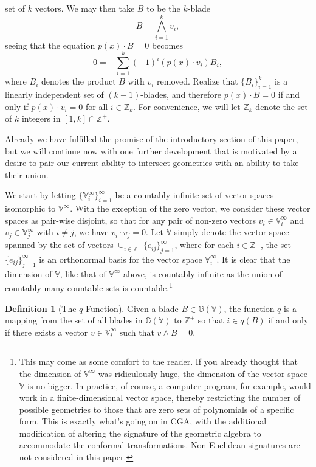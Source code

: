 \documentclass{birkjour}
\theoremstyle{definition}
\newtheorem{defn}[thm]{Definition}
\theoremstyle{remark}
\numberwithin{equation}{section}
\newcommand{\G}{\mathbb{G}}
\newcommand{\V}{\mathbb{V}}
\newcommand{\Z}{\mathbb{Z}}
\begin{document}
set of $k$ vectors.
We may then take $B$ to be the $k$-blade
\begin{equation}
B=\bigwedge_{i=1}^k v_i,
\end{equation}
seeing that the equation $p(x)\cdot B=0$ becomes
\begin{equation}\label{equ_intersection_of_geometries}
0 = -\sum_{i=1}^k (-1)^i(p(x)\cdot v_i)B_i,
\end{equation}
where $B_i$ denotes the product $B$ with $v_i$ removed.  Realize
that $\{B_i\}_{i=1}^k$ is a linearly independent set of $(k-1)$-blades,
and therefore $p(x)\cdot B=0$ if and only if $p(x)\cdot v_i=0$ for all $i\in\Z_k$.
For convenience, we will let $\Z_k$ denote the set of $k$ integers in $[1,k]\cap\Z^+$.

Already we have fulfilled the promise of the introductory section of this paper,
but we will continue now with one further development that is motivated by a desire
to pair our current ability to intersect geometries with an ability to take their union.

We start by letting $\{\V_i^\infty\}_{i=1}^\infty$ be a countably infinite set of
vector spaces isomorphic to $\V^\infty$.  With the exception of the zero vector,
we consider these vector spaces as pair-wise disjoint, so that for any pair of non-zero
vectors $v_i\in\V_i^\infty$ and $v_j\in\V_j^\infty$ with $i\neq j$, we have $v_i\cdot v_j=0$.
Let $\V$ simply denote the vector space spanned by the set of vectors $\cup_{i\in\Z^+}\{e_{ij}\}_{j=1}^\infty$,
where for each $i\in\Z^+$, the set $\{e_{ij}\}_{j=1}^\infty$ is an orthonormal basis for
the vector space $\V_i^\infty$.
It is clear that the dimension of $\V$,
like that of $\V^\infty$ above, is countably infinite as the union of countably many countable
sets is countable.\footnote{This may come as some comfort to the reader. If you already thought that
the dimension of $\V^\infty$ was ridiculously huge, the dimension of the vector space $\V$ is no bigger.
In practice, of course, a computer
program, for example, would work in a finite-dimensional vector space, thereby restricting
the number of possible geometries to those that are zero sets of polynomials of a specific form.
This is exactly what's going on in CGA, with the additional modification of altering the signature
of the geometric algebra to accommodate the conformal transformations.  Non-Euclidean signatures
are not considered in this paper.}

\begin{defn}[The $q$ Function]\label{def_q_func}
Given a blade $B\in\G(\V)$, the function $q$ is a mapping from
the set of all blades in $\G(\V)$ to $\Z^+$ so that $i\in q(B)$ if and only if
there exists a vector $v\in\V_i^\infty$ such that $v\wedge B=0$.
\end{defn}
\end{document}
